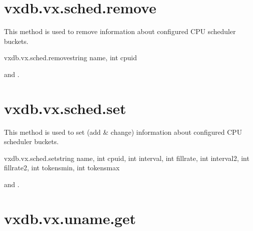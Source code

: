 \rpcnoerrors


\section{vxdb.vx.sched.remove}

This method is used to remove information about configured CPU scheduler
buckets.

\begin{rpcsynopsis}{vxdb.vx.sched.remove}{string name, int cpuid}
\end{rpcsynopsis}

\begin{rpcaccess}
 and \rpcownerchecks.
\end{rpcaccess}

\rpcreturnnil

\rpcnoerrors


\section{vxdb.vx.sched.set}

This method is used to set (add \& change) information about configured CPU
scheduler buckets.

\begin{rpcsynopsis}{vxdb.vx.sched.set}{string name, int cpuid, int interval,
	int fillrate, int interval2, int fillrate2, int tokensmin, int tokensmax}
\end{rpcsynopsis}

\begin{rpcaccess}
 and \rpcownerchecks.
\end{rpcaccess}

\rpcreturnnil

\rpcnoerrors


\section{vxdb.vx.uname.get}


